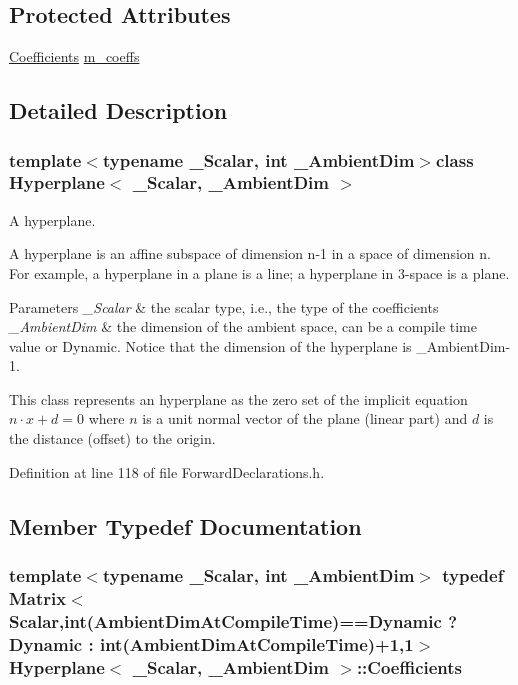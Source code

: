 \subsection*{Protected Attributes}
\begin{DoxyCompactItemize}
\item 
\hyperlink{class_hyperplane_ab7c2ddb9b72c5b8bbf5b754bd54b3f48}{Coefficients} \hyperlink{class_hyperplane_a641ff024d9a1d9f811bf7221643c37fd}{m\-\_\-coeffs}
\end{DoxyCompactItemize}


\subsection{Detailed Description}
\subsubsection*{template$<$typename \-\_\-\-Scalar, int \-\_\-\-Ambient\-Dim$>$class Hyperplane$<$ \-\_\-\-Scalar, \-\_\-\-Ambient\-Dim $>$}

A hyperplane. 

A hyperplane is an affine subspace of dimension n-\/1 in a space of dimension n. For example, a hyperplane in a plane is a line; a hyperplane in 3-\/space is a plane.


\begin{DoxyParams}{Parameters}
{\em \-\_\-\-Scalar} & the scalar type, i.\-e., the type of the coefficients \\
\hline
{\em \-\_\-\-Ambient\-Dim} & the dimension of the ambient space, can be a compile time value or Dynamic. Notice that the dimension of the hyperplane is \-\_\-\-Ambient\-Dim-\/1.\\
\hline
\end{DoxyParams}
This class represents an hyperplane as the zero set of the implicit equation $ n \cdot x + d = 0 $ where $ n $ is a unit normal vector of the plane (linear part) and $ d $ is the distance (offset) to the origin. 

Definition at line 118 of file Forward\-Declarations.\-h.



\subsection{Member Typedef Documentation}
\hypertarget{class_hyperplane_ab7c2ddb9b72c5b8bbf5b754bd54b3f48}{
\subsubsection[{Coefficients}]{\setlength{\rightskip}{0pt plus 5cm}template$<$typename \-\_\-\-Scalar, int \-\_\-\-Ambient\-Dim$>$ typedef {\bf Matrix}$<${\bf Scalar},{\bf int}(Ambient\-Dim\-At\-Compile\-Time)=={\bf Dynamic} ? {\bf Dynamic} \-: {\bf int}(Ambient\-Dim\-At\-Compile\-Time)+1,1$>$ {\bf Hyperplane}$<$ \-\_\-\-Scalar, \-\_\-\-Ambient\-Dim $>$\-::{\bf Coefficients}}}\label{class_hyperplane_ab7c2ddb9b72c5b8bbf5b754bd54b3f48}


